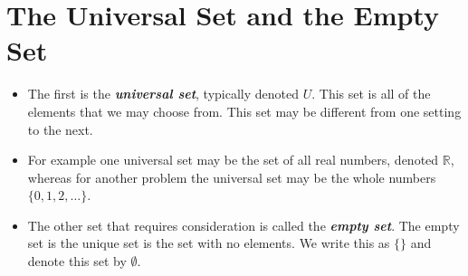 





\section*{The Universal Set and the Empty Set}
\begin{itemize}
\item The first is the \textbf{\textit{universal set}}, typically denoted $U$. This set is all of the elements that we may choose from. This set may be different from one setting to the next. 

\item For example one universal set may be the set of all real numbers, denoted $\mathbb{R}$, whereas for another problem the universal set may be the whole numbers $\{0, 1, 2,\ldots\}$.

\item The other set that requires consideration is called the \textit{\textbf{empty set}}. The empty set is the unique set is the set with no elements. We write this as $\{ \}$ and denote this set by $\emptyset$.
\end{itemize}

